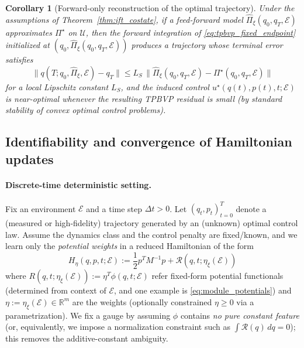 \documentclass{article} %
\newtheorem{corollary}[theorem]{Corollary}
\begin{document}
\begin{corollary}[Forward-only reconstruction of the optimal trajectory]
\label{cor:forward_only_det}
Under the assumptions of Theorem~\ref{thm:ift_costate}, if a feed-forward model $\widehat \Pi_\xi(q_0,q_T,\mathcal E)$
approximates $\Pi^\star$ on $\mathcal U$, then the forward integration of \cref{eq:tpbvp_fixed_endpoint} initialized at
$(q_0,\widehat \Pi_\xi(q_0,q_T,\mathcal E))$ produces a trajectory whose terminal error satisfies
\[
\|q(T;q_0,\widehat \Pi_\xi,\mathcal E)-q_T\|
\le L_S\,\|\widehat \Pi_\xi(q_0,q_T,\mathcal E)-\Pi^\star(q_0,q_T,\mathcal E)\|
\]
for a local Lipschitz constant $L_S$, and the induced control $u^\star(q(t),p(t),t;\mathcal E)$ is near-optimal
whenever the resulting TPBVP residual is small (by standard stability of convex optimal control problems).
\end{corollary}

\subsection{Identifiability and convergence of Hamiltonian updates}
\label{app:learnability}

\paragraph{Discrete-time deterministic setting.}
Fix an environment $\mathcal E$ and a time step $\Delta t>0$. Let $(q_t,p_t)_{t=0}^{T}$ denote a (measured or high-fidelity)
trajectory generated by an (unknown) optimal control law. Assume the dynamics class and the control penalty are fixed/known, and
we learn only the \emph{potential weights} in a reduced Hamiltonian of the form
\begin{equation}
\label{eq:H_eta_discrete}
H_\eta(q,p,t;\mathcal E)
:=  \frac{1}{2}p^TM^{-1}p
+\mathcal R(q, t;\eta_{\xi}(\mathcal{E}))
\end{equation}
where $R(q, t;\eta_{\xi}(\mathcal{E})):=\eta^T\phi(q,t;\mathcal E)$ refer fixed-form potential functionals (determined from context of $\mathcal{E}$, and one example is \cref{eq:module_potentials}) and
$\eta:= \eta_{\xi}(\mathcal{E})\in\mathbb R^{m}$ are the weights (optionally constrained $\eta\ge 0$ via a parametrization).
We fix a gauge by assuming $\phi$ contains \emph{no pure constant feature} (or, equivalently, we impose a normalization constraint
such as $\int \mathcal R(q)\,dq=0$); this removes the additive-constant ambiguity.
\end{document}
